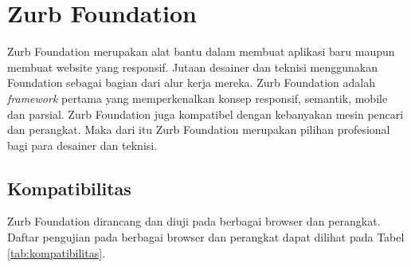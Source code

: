\section{Zurb Foundation \cite{Zurb:2014}}
\label{sec:zurbfoundation}

Zurb Foundation merupakan alat bantu dalam membuat aplikasi baru maupun membuat website yang responsif. Jutaan desainer dan teknisi menggunakan Foundation sebagai bagian dari alur kerja mereka. Zurb Foundation adalah {\it framework} pertama yang memperkenalkan konsep responsif, semantik, mobile dan parsial. Zurb Foundation juga kompatibel dengan kebanyakan mesin pencari dan perangkat. Maka dari itu Zurb Foundation merupakan pilihan profesional bagi para desainer dan teknisi.

\subsection{Kompatibilitas}
Zurb Foundation dirancang dan diuji pada berbagai browser dan perangkat. Daftar pengujian pada berbagai browser dan perangkat dapat dilihat pada Tabel \ref{tab:kompatibilitas}.


